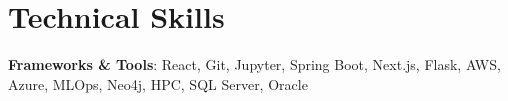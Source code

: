 \section{Technical Skills}
 \begin{itemize}[leftmargin=0.15in, label={}]
    \small{\item{
     \iftoggle{aiml}{
         \textbf{ML \& Quantum}{: PyTorch, Tensorflow, Scikit-learn, Pandas, MLflow, Pennylane, Qiskit, OpenCV, NumPy, Matplotlib} \\
         \textbf{Languages}{: Python, Java, C, Typescript, HTML/CSS, OCaml, C\#, Assembly (x86-64), UML, SQL, SAS} \\
     }{
         \textbf{Languages}{: Python, Java, C, Typescript, HTML/CSS, OCaml, C\#, Assembly (x86-64), UML, SQL, SAS} \\
         \textbf{ML \& Quantum}{: PyTorch, Tensorflow, Pennylane, Qiskit, Scikit-learn, Pandas, MLflow, OpenCV, NumPy, Matplotlib} \\
     }
     \textbf{Frameworks \& Tools}{: React, Git, Jupyter, Spring Boot, Next.js, Flask, AWS, Azure, MLOps, Neo4j, HPC, SQL Server, Oracle}
    }}
 \end{itemize}
